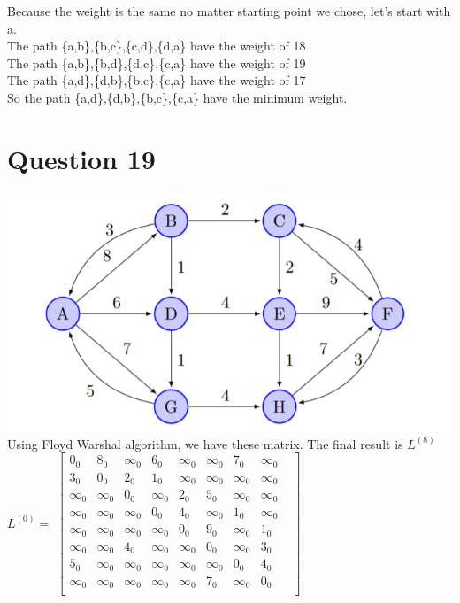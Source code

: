 \documentclass{article}
\begin{document}
\newline
Because the weight is the same no matter starting point we chose, let's start with a.\\
The path \{a,b\},\{b,c\},\{c,d\},\{d,a\} have the weight of 18\\
The path \{a,b\},\{b,d\},\{d,c\},\{c,a\} have the weight of 19\\
The path \{a,d\},\{d,b\},\{b,c\},\{c,a\} have the weight of 17\\
So the path \{a,d\},\{d,b\},\{b,c\},\{c,a\} have the minimum weight.

\section*{Question 19}
\includegraphics[]{Question 19/connectivity_19.png}
\newline
Using Floyd Warshal algorithm, we have these matrix. The final result is $L^{(8)}$\\
$L^{(0)} = $
$\begin{bmatrix}
0_0 & 8_0 & \infty_0 & 6_0 & \infty_0 & \infty_0 & 7_0 & \infty_0 & \\
3_0 & 0_0 & 2_0 & 1_0 & \infty_0 & \infty_0 & \infty_0 & \infty_0 & \\
\infty_0 & \infty_0 & 0_0 & \infty_0 & 2_0 & 5_0 & \infty_0 & \infty_0 & \\
\infty_0 & \infty_0 & \infty_0 & 0_0 & 4_0 & \infty_0 & 1_0 & \infty_0 & \\
\infty_0 & \infty_0 & \infty_0 & \infty_0 & 0_0 & 9_0 & \infty_0 & 1_0 & \\
\infty_0 & \infty_0 & 4_0 & \infty_0 & \infty_0 & 0_0 & \infty_0 & 3_0 & \\
5_0 & \infty_0 & \infty_0 & \infty_0 & \infty_0 & \infty_0 & 0_0 & 4_0 & \\
\infty_0 & \infty_0 & \infty_0 & \infty_0 & \infty_0 & 7_0 & \infty_0 & 0_0 & \\
\end{bmatrix}$
\end{document}
